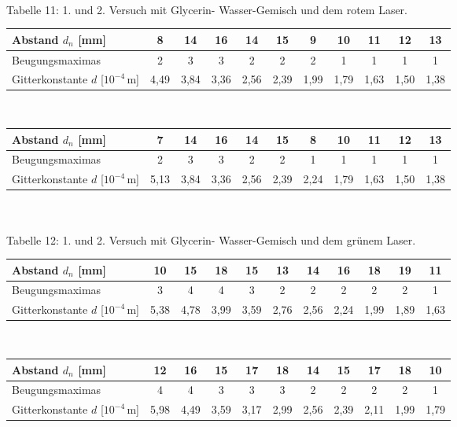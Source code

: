 \documentclass[fontsize=12pt]{scrartcl}
\begin{document}
~\\
Tabelle 11: 1. und 2. Versuch mit Glycerin- Wasser-Gemisch und dem rotem Laser. \\
\begin{tabular}{|l|c|c|c|c|c|c|c|c|c|c|} \hline
Abstand $d_n$ [mm] & 8 & 14 & 16 & 14 & 15 & 9 & 10 & 11 & 12 & 13 \\ \hline
Beugungsmaximas & 2 & 3 & 3 & 2 & 2 & 2 & 1 & 1 & 1 & 1 \\ \hline 
Gitterkonstante $d$ [$10^{-4}$\,m] &4,49 & 3,84 & 3,36 & 2,56 & 2,39 & 1,99 & 1,79 & 1,63 & 1,50 & 1,38 \\ \hline
\end{tabular} \\
\begin{tabular}{|l|c|c|c|c|c|c|c|c|c|c|} \hline
Abstand $d_n$ [mm] & 7 & 14 & 16 & 14 & 15 & 8 & 10 & 11 & 12 & 13 \\ \hline
Beugungsmaximas & 2 & 3 & 3 & 2 & 2 & 1 & 1 & 1 & 1 & 1 \\ \hline 
Gitterkonstante $d$ [$10^{-4}$\,m] & 5,13 & 3,84 & 3,36 & 2,56 & 2,39 & 2,24 & 1,79 & 1,63 & 1,50 & 1,38 \\ \hline
\end{tabular} \\
~\\
Tabelle 12: 1. und 2. Versuch mit Glycerin- Wasser-Gemisch und dem grünem Laser. \\
\begin{tabular}{|l|c|c|c|c|c|c|c|c|c|c|} \hline
Abstand $d_n$ [mm] & 10 & 15 & 18 & 15 & 13 & 14 & 16 & 18 & 19 & 11 \\ \hline
Beugungsmaximas & 3 & 4 & 4 & 3 & 2 & 2 & 2 & 2 & 2 & 1 \\ \hline 
Gitterkonstante $d$ [$10^{-4}$\,m] & 5,38 & 4,78 & 3,99 & 3,59 & 2,76 & 2,56 & 2,24 & 1,99 &  1,89  & 1,63  \\ \hline
\end{tabular} \\
\begin{tabular}{|l|c|c|c|c|c|c|c|c|c|c|} \hline
Abstand $d_n$ [mm] & 12 & 16 & 15 & 17 & 18 & 14 & 15 & 17 & 18 & 10 \\ \hline
Beugungsmaximas & 4 & 4 & 3 & 3 & 3 & 2 & 2 & 2 & 2 & 1 \\ \hline 
Gitterkonstante $d$ [$10^{-4}$\,m] & 5,98 & 4,49 & 3,59 & 3,17 & 2,99 & 2,56 & 2,39 & 2,11 & 1,99 & 1,79  \\ \hline
\end{tabular}
\newpage
\end{document}
